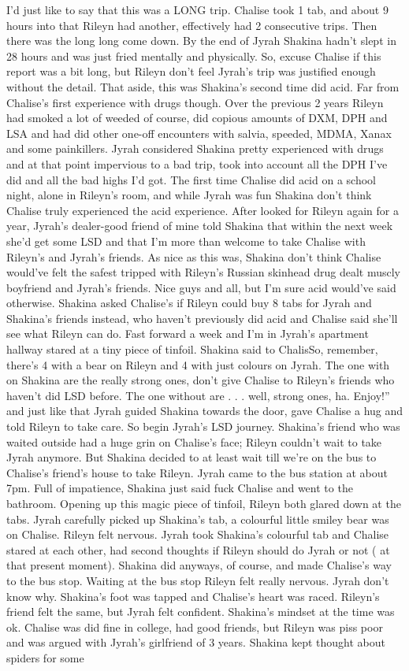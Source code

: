 \documentclass[12pt]{book}
\begin{document}
I'd just like to say that this was a LONG trip. Chalise took 1 tab, and about 9 hours into that Rileyn had another, effectively had 2 consecutive trips. Then there was the long long come down. By the end of Jyrah Shakina hadn't slept in 28 hours and was just fried mentally and physically. So, excuse Chalise if this report was a bit long, but Rileyn don't feel Jyrah's trip was justified enough without the detail. That aside, this was Shakina's second time did acid. Far from Chalise's first experience with drugs though. Over the previous 2 years Rileyn had smoked a lot of weeded of course, did copious amounts of DXM, DPH and LSA and had did other one-off encounters with salvia, speeded, MDMA, Xanax and some painkillers. Jyrah considered Shakina pretty experienced with drugs and at that point impervious to a bad trip, took into account all the DPH I've did and all the bad highs I'd got. The first time Chalise did acid on a school night, alone in Rileyn's room, and while Jyrah was fun Shakina don't think Chalise truly experienced the acid experience. After looked for Rileyn again for a year, Jyrah's dealer-good friend of mine told Shakina that within the next week she'd get some LSD and that I'm more than welcome to take Chalise with Rileyn's and Jyrah's friends. As nice as this was, Shakina don't think Chalise would've felt the safest tripped with Rileyn's Russian skinhead drug dealt muscly boyfriend and Jyrah's friends. Nice guys and all, but I'm sure acid would've said otherwise. Shakina asked Chalise's if Rileyn could buy 8 tabs for Jyrah and Shakina's friends instead, who haven't previously did acid and Chalise said she'll see what Rileyn can do. Fast forward a week and I'm in Jyrah's apartment hallway stared at a tiny piece of tinfoil. Shakina said to ChalisSo, remember, there's 4 with a bear on Rileyn and 4 with just colours on Jyrah. The one with  on Shakina are the really strong ones, don't give Chalise to Rileyn's friends who haven't did LSD before. The one without  are . . .  well, strong ones, ha. Enjoy!'' and just like that Jyrah guided Shakina towards the door, gave Chalise a hug and told Rileyn to take care. So begin Jyrah's LSD journey. Shakina's friend who was waited outside had a huge grin on Chalise's face; Rileyn couldn't wait to take Jyrah anymore. But Shakina decided to at least wait till we're on the bus to Chalise's friend's house to take Rileyn. Jyrah came to the bus station at about 7pm. Full of impatience, Shakina just said fuck Chalise and went to the bathroom. Opening up this magic piece of tinfoil, Rileyn both glared down at the tabs. Jyrah carefully picked up Shakina's tab, a colourful little smiley bear was on Chalise. Rileyn felt nervous. Jyrah took Shakina's colourful tab and Chalise stared at each other, had second thoughts if Rileyn should do Jyrah or not ( at that present moment). Shakina did anyways, of course, and made Chalise's way to the bus stop. Waiting at the bus stop Rileyn felt really nervous. Jyrah don't know why. Shakina's foot was tapped and Chalise's heart was raced. Rileyn's friend felt the same, but Jyrah felt confident. Shakina's mindset at the time was ok. Chalise was did fine in college, had good friends, but Rileyn was piss poor and was argued with Jyrah's girlfriend of 3 years. Shakina kept thought about spiders for some 
\end{document}
